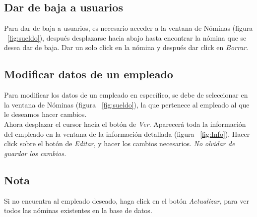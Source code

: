 \documentclass[12pt]{amsart}
\begin{document}
\subsection{Dar de baja a usuarios}
{Para dar de baja a usuarios, es necesario acceder a la ventana de N\'ominas (figura ~\ref{fig:sueldo}), despu\'es desplazarse hacia abajo hasta encontrar la n\'omina que se desea dar de baja. Dar un solo click en la n\'omina y despu\'es dar click en \textit{Borrar}.}

\subsection{Modificar datos de un empleado}
{Para modificar los datos de un empleado en espec\'ifico, se debe de seleccionar en la ventana de N\'ominas (figura ~\ref{fig:sueldo}), la que pertenece al empleado al que le deseamos hacer cambios.}\\
{Ahora desplazar el cursor hacia el bot\'on de \textit{Ver}. Aparecer\'a toda la informaci\'on del empleado en la ventana de la informaci\'on detallada (figura ~\ref{fig:Info}), Hacer click sobre el bot\'on de \textit{Editar}, y hacer los cambios necesarios. \textit{No olvidar de guardar los cambios.}}

\subsection{Nota}
{Si no encuentra al empleado deseado, haga click en el bot\'on \textit{Actualizar}, para ver todos las n\'ominas existentes en la base de datos.}
\end{document}
